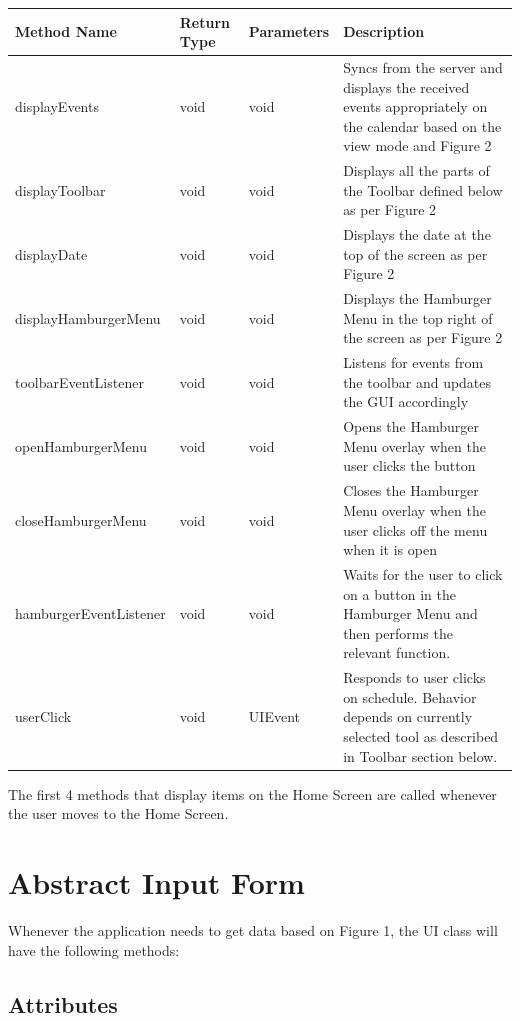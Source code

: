 \documentclass{scrreprt}
\begin{document}
\begin{center}
\begin{longtable}{ | p{5cm} | p{2cm} | p{3cm} | p{5cm} | }
\hline
\textbf{Method Name} & \textbf{Return Type} & \textbf{Parameters} & \textbf{Description} \\
\hline
displayEvents & void & void & Syncs from the server and displays the received events appropriately on the calendar based on the view mode and Figure 2 \\
\hline
displayToolbar & void & void & Displays all the parts of the Toolbar defined below as per Figure 2 \\
\hline
displayDate & void & void & Displays the date at the top of the screen as per Figure 2 \\
\hline
displayHamburgerMenu & void & void & Displays the Hamburger Menu in the top right of the screen as per Figure 2 \\
\hline
toolbarEventListener & void & void & Listens for events from the toolbar and updates the GUI accordingly \\
\hline
openHamburgerMenu & void & void & Opens the Hamburger Menu overlay when the user clicks the button \\
\hline
closeHamburgerMenu & void & void & Closes the Hamburger Menu overlay when the user clicks off the menu when it is open \\
\hline
hamburgerEventListener & void & void & Waits for the user to click on a button in the Hamburger Menu and then performs the relevant function. \\
\hline
userClick & void & UIEvent & Responds to user clicks on schedule. Behavior depends on currently selected tool as described in Toolbar section below.\\
\hline
\end{longtable}
\end{center}

The first 4 methods that display items on the Home Screen are called whenever the user moves to the Home Screen.

\section{Abstract Input Form}

Whenever the application needs to get data based on Figure 1, the UI class will have the following methods:

\subsection{Attributes}
\end{document}
